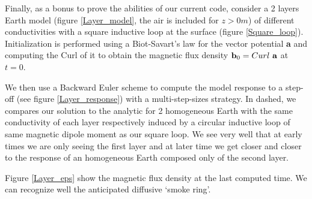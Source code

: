 \documentclass[twoside]{article}
\begin{document}
Finally, as a bonus to prove the abilities of our current code, consider a 2 layers Earth model (figure \ref{Layer_model}, the air is included for $z>0m$) of different conductivities with a square inductive loop at the surface (figure \ref{Square_loop}). Initialization is performed using a Biot-Savart's law for the vector potential \textbf{a} and computing the Curl of it to obtain the magnetic flux density ${\bf b}_0 = Curl~{\bf a}$ at $t=0$.

We then use a Backward Euler scheme to compute the model response to a step-off (see figure \ref{Layer_response}) with a multi-step-sizes strategy. In dashed, we compares our solution to the analytic for 2 homogeneous Earth with the same conductivity of each layer respectively induced by a circular inductive loop of same magnetic dipole moment as our square loop. We see very well that at early times we are only seeing the first layer and at later time we get closer and closer to the response of an homogeneous Earth composed only of the second layer. 

Figure \ref{Layer_eps} show the magnetic flux density at the last computed time. We can recognize well the anticipated diffusive `smoke ring'.
\end{document}

